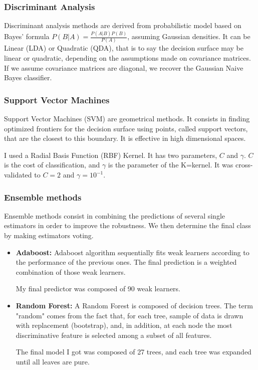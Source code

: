 \documentclass[12pt]{report}
\begin{document}
\subsubsection{Discriminant Analysis}

Discriminant analysis methods are derived from probabilistic model based on Bayes' formula $P(B|A) = \frac{P(A|B)P(B)}{P(A)}$, assuming Gaussian densities. It can be Linear (LDA) or Quadratic (QDA), that is to say the decision surface may be linear or quadratic, depending on the assumptions made on covariance matrices. If we assume covariance matrices are diagonal, we recover the Gaussian Naive Bayes classifier.

\subsubsection{Support Vector Machines}

Support Vector Machines (SVM) are geometrical methods. It consists in finding optimized frontiers for the decision surface using points, called support vectors, that are the closest to this boundary.  It is effective in high dimensional spaces.

I used a Radial Basis Function (RBF) Kernel. It has two parameters, $C$ and $\gamma$. $C$ is the cost of classification, and $\gamma$ is the parameter of the K=kernel. It was cross-validated to $C= 2$ and $\gamma=10^{-1}$.

\subsubsection{Ensemble methods}

Ensemble methods consist in combining the predictions of several single estimators in order to improve the robustness. We then determine the final class by making estimators voting.

\begin{itemize}
\item \textbf{Adaboost:} Adaboost algorithm sequentially fits weak learners according to the performance of the previous ones. The final prediction is a weighted combination of those weak learners.

My final predictor was composed of 90 weak learners.

\item \textbf{Random Forest:} A Random Forest is composed of decision trees. The term "random" comes from the fact that, for each tree, sample of data is drawn with replacement (bootstrap), and, in addition, at each node the most discriminative feature is selected among a subset of all features.

The final model I got was composed of 27 trees, and each tree was expanded until all leaves are pure.
\end{itemize}
\end{document}
